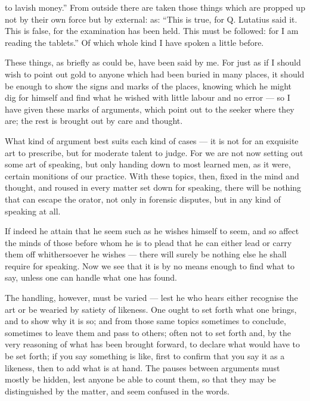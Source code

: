  to lavish money.'' From outside there are taken those things which are propped up not by their own force but by external: as: ``This is true, for Q. Lutatius said it. This is false, for the examination has been held. This must be followed: for I am reading the tablets.'' Of which whole kind I have spoken a little before.

 These things, as briefly as could be, have been said by me. For just as if I should wish to point out gold to anyone which had been buried in many places, it should be enough to show the signs and marks of the places, knowing which he might dig for himself and find what he wished with little labour and no error — so I have given these marks of arguments, which point out to the seeker where they are; the rest is brought out by care and thought.

 What kind of argument best suits each kind of cases — it is not for an exquisite art to prescribe, but for moderate talent to judge. For we are not now setting out some art of speaking, but only handing down to most learned men, as it were, certain monitions of our practice. With these topics, then, fixed in the mind and thought, and roused in every matter set down for speaking, there will be nothing that can escape the orator, not only in forensic disputes, but in any kind of speaking at all.

 If indeed he attain that he seem such as he wishes himself to seem, and so affect the minds of those before whom he is to plead that he can either lead or carry them off whithersoever he wishes — there will surely be nothing else he shall require for speaking. Now we see that it is by no means enough to find what to say, unless one can handle what one has found.

 The handling, however, must be varied — lest he who hears either recognise the art or be wearied by satiety of likeness. One ought to set forth what one brings, and to show why it is so; and from those same topics sometimes to conclude, sometimes to leave them and pass to others; often not to set forth and, by the very reasoning of what has been brought forward, to declare what would have to be set forth; if you say something is like, first to confirm that you say it as a likeness, then to add what is at hand. The pauses between arguments must mostly be hidden, lest anyone be able to count them, so that they may be distinguished by the matter, and seem confused in the words.

